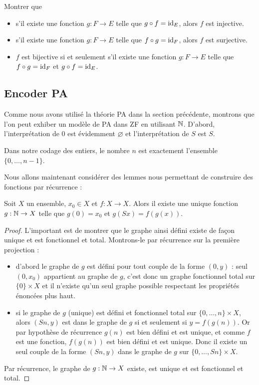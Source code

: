 \begin{exo}
    Montrer que
    \begin{itemize}[label=$\bullet$]
        \item s'il existe une fonction $g : F\to E$ telle que $g\circ f = \mathrm{id}_E$, alors $f$ est injective.
        \item s'il existe une fonction $g : F \to E$ telle que $f\circ g = \mathrm{id}_F$, alors $f$ est surjective.
        \item $f$ est bijective si et seulement s'il existe une fonction $g : F \to E$ telle que $f\circ g = \mathrm{id}_F$ et $g\circ f = \mathrm{id}_E$.
    \end{itemize}
\end{exo}

\subsection{Encoder PA}

Comme nous avons utilisé la théorie PA dans la section précédente, montrons que l'on peut exhiber un modèle de PA dans ZF en utilisant $\mathbb{N}$. D'abord, l'interprétation de $0$ est évidemment $\varnothing$ et l'interprétation de $S$ est $S$.

\begin{rmk}
    Dans notre codage des entiers, le nombre $n$ est exactement l'ensemble $\{0,\ldots,n-1\}$.
\end{rmk}

Nous allons maintenant considérer des lemmes nous permettant de construire des fonctions par récurrence :

\begin{lem}
    Soit $X$ un ensemble, $x_0\in X$ et $f : X \to X$. Alors il existe une unique fonction $g : \mathbb{N}\to X$ telle que $g(0) = x_0$ et $g(Sx) = f(g(x))$.
\end{lem}

\begin{proof}
    L'important est de montrer que le graphe ainsi défini existe de façon unique et est fonctionnel et total. Montrons-le par récurrence sur la première projection :
    \begin{itemize}[label=$\bullet$]
        \item d'abord le graphe de $g$ est défini pour tout couple de la forme $(0,y)$ : seul $(0,x_0)$ appartient au graphe de $g$, c'est donc un graphe fonctionnel total sur $\{0\}\times X$ et il n'existe qu'un seul graphe possible respectant les propriétés énoncées plus haut.
        \item si le graphe de $g$ (unique) est défini et fonctionnel total sur $\{0,\ldots,n\}\times X$, alors $(Sn,y)$ est dans le graphe de $g$ si et seulement si $y=f(g(n))$. Or par hypothèse de récurrence $g(n)$ est bien défini et est unique, et comme $f$ est une fonction, $f(g(n))$ est bien défini et est unique. Donc il existe un seul couple de la forme $(Sn,y)$ dans le graphe de $g$ sur $\{0,\ldots,Sn\}\times X$.
    \end{itemize}
    Par récurrence, le graphe de $g : \mathbb{N}\to X$ existe, est unique et est fonctionnel et total.
\end{proof}

